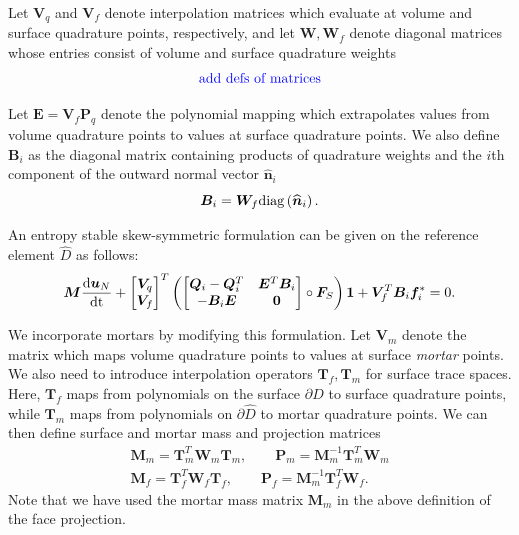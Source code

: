 \documentclass[review]{siamart0216}
\renewcommand{\hat}{\widehat}
\newcommand{\td}[2]{\frac{{\rm d}#1}{{\rm d}{\rm #2}}}
\newcommand{\LRp}[1]{\left( #1 \right)}
\newcommand{\note}[1]{{\color{blue}{#1}}}
\newcommand{\diag}[1]{{\rm diag}\LRp{#1}}
\begin{document}
Let $\bm{V}_q$ and $\bm{V}_f$ denote interpolation matrices which evaluate at volume and surface quadrature points, respectively, and let $\bm{W}, \bm{W}_f$ denote diagonal matrices whose entries consist of volume and surface quadrature weights
\[
\text{\note{add defs of matrices}}
\]

Let $\bm{E} = \bm{V}_f\bm{P}_q$ denote the polynomial mapping which extrapolates values from volume quadrature points to values at surface quadrature points.  We also define $\bm{B}_i$ as the diagonal matrix containing products of quadrature weights and the $i$th component of the outward normal vector $\hat{\bm{n}}_i$
\[
\bm{B}_i = \bm{W}_f \diag{\hat{\bm{n}}_i}.
\]

An entropy stable skew-symmetric formulation can be given on the reference element $\hat{D}$ as follows:
\[
\bm{M}\td{\bm{u}_N}{t} + \begin{bmatrix} \bm{V}_q \\ \bm{V}_f \end{bmatrix}^T
\LRp{\begin{bmatrix}
\bm{Q}_i-\bm{Q}_i^T & \bm{E}^T\bm{B}_i\\
-\bm{B}_i\bm{E} & \bm{0}
\end{bmatrix} \circ \bm{F}_S}\bm{1} + \bm{V}_f^T\bm{B}_i\bm{f}_i^* = 0.  
\]

We incorporate mortars by modifying this formulation.  Let $\bm{V}_m$ denote the matrix which maps volume quadrature points to values at surface \textit{mortar} points.  We also need to introduce interpolation operators $\bm{T}_f, \bm{T}_m$ for surface trace spaces.  Here, $\bm{T}_f$ maps from polynomials on the surface $\partial \hat{D}$ to surface quadrature points, while $\bm{T}_m$ maps from polynomials on $\partial \hat{D}$ to mortar quadrature points.  We can then define surface and mortar mass and projection matrices
\begin{align*}
\bm{M}_m = \bm{T}_m^T\bm{W}_m\bm{T}_m, \qquad \bm{P}_m = \bm{M}_m^{-1}\bm{T}_m^T\bm{W}_m\\
\bm{M}_f = \bm{T}_f^T\bm{W}_f\bm{T}_f, \qquad \bm{P}_f = \bm{M}_m^{-1}\bm{T}_f^T\bm{W}_f.
\end{align*}
Note that we have used the mortar mass matrix $\bm{M}_m$ in the above definition of the face projection.  %
\end{document}
